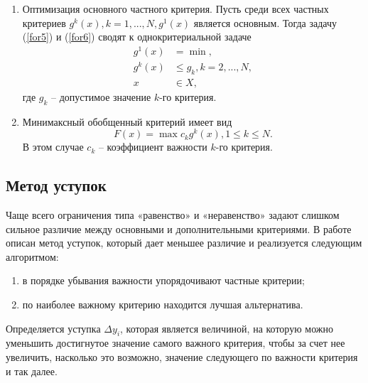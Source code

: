 \begin{enumerate}[label=\arabic*)]
    \item Оптимизация основного частного критерия. Пусть среди всех частных критериев \begin{math}g^k(x), k = 1, ... ,N, g^1(x)\end{math} является основным. Тогда задачу (\ref{for5}) и (\ref{for6}) сводят к однокритериальной задаче
    \begin{equation} \label{for7}
    \begin{split}
g^1(x)& = \min,\\
  g^k(x)& \leq g_k, k = 2, ..., N, \\
  x &\in X,
    \end{split}
    \end{equation}
    где \begin{math}g_k\end{math} -- допустимое значение $k$-го критерия.
    \item Минимаксный обобщенный критерий имеет вид
    \begin{equation} \label{for7}
    F(x) = \max c_kg^k(x), 1 \leq k \leq N.
    \end{equation}
    В этом случае \begin{math}c_k\end{math} -- коэффициент важности $k$-го критерия.
\end{enumerate}

\subsection{Метод уступок}

Чаще всего ограничения типа «равенство» и «неравенство» задают слишком сильное различие между основными и дополнительными критериями. В работе \cite{bib6} описан метод уступок, который дает меньшее различие и реализуется следующим алгоритмом:
\begin{enumerate}[label=\arabic*)]
    \item в порядке убывания важности упорядочивают частные критерии;
    \item по наиболее важному критерию находится лучшая альтернатива.
\end{enumerate}
Определяется уступка \begin{math}\Delta y_i \end{math}, которая является величиной, на которую можно уменьшить достигнутое значение самого важного критерия, чтобы за счет нее увеличить, насколько это возможно, значение следующего по важности критерия и так далее.

